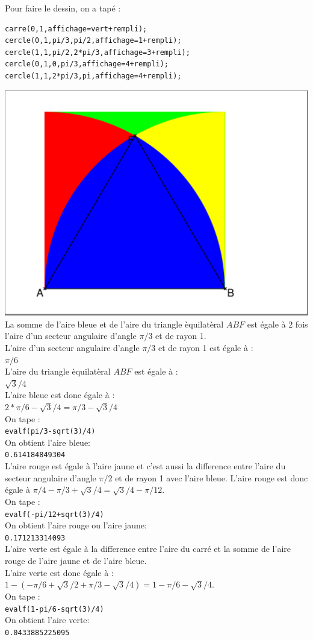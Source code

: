 \documentclass[a4paper,11pt]{book}
\begin{document}
Pour faire le dessin, on a tap\'e :
\begin{verbatim}
carre(0,1,affichage=vert+rempli);
cercle(0,1,pi/3,pi/2,affichage=1+rempli);
cercle(1,1,pi/2,2*pi/3,affichage=3+rempli);
cercle(0,1,0,pi/3,affichage=4+rempli);
cercle(1,1,2*pi/3,pi,affichage=4+rempli);
\end{verbatim}
\includegraphics[width=\textwidth]{airearc1}\\
La somme de l'aire bleue et de l'aire du triangle \`equilat\`eral $ABF$ est 
\'egale \`a 2 fois l'aire d'un secteur angulaire d'angle $\pi/3$ et de rayon 1.\\
L'aire d'un secteur angulaire d'angle $\pi/3$ et de rayon 1 est \'egale \`a :\\
$\pi/6$\\
L'aire du triangle \`equilat\`eral $ABF$ est \'egale \`a :\\
$\sqrt 3/4$\\
L'aire bleue est donc \'egale \`a :\\
$2*\pi/6-\sqrt 3/4=\pi/3-\sqrt 3/4$\\
On tape :\\
{\tt evalf(pi/3-sqrt(3)/4)}\\
On obtient l'aire bleue:\\
{\tt 0.614184849304}\\
L'aire rouge est \'egale \`a l'aire jaune et c'est aussi la difference entre 
l'aire du secteur angulaire d'angle $\pi/2$ et de rayon 1 avec l'aire bleue.
L'aire rouge est donc \'egale \`a $\pi/4-\pi/3+\sqrt 3/4=\sqrt 3/4-\pi/12$.\\
On tape :\\
{\tt evalf(-pi/12+sqrt(3)/4)}\\
On obtient l'aire rouge ou l'aire jaune:\\
{\tt 0.171213314093}\\
L'aire verte est \'egale \`a la difference entre l'aire du carr\'e et la somme 
de l'aire rouge de l'aire jaune et de l'aire bleue.\\
L'aire verte est donc \'egale \`a :\\
$1-(-\pi/6+\sqrt 3/2+\pi/3-\sqrt 3/4)=1-\pi/6-\sqrt 3/4$.\\
On tape :\\
{\tt evalf(1-pi/6-sqrt(3)/4)}\\
On obtient l'aire verte:\\
{\tt 0.0433885225095}
\end{document}
